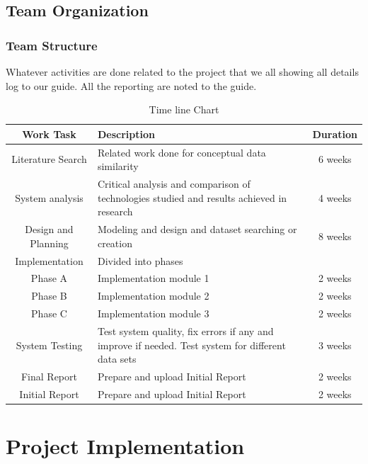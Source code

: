 \documentclass[oneside,a4paper,12pt]{report}
\begin{document}
{\begin{center}
\begin{figure}[!htbp]
	\end{figure}
\end{center} 


\newpage
\section{Team Organization}
\subsection{Team Structure}
Whatever activities are done related to the project that we all showing all details log to our guide. All the reporting are noted to the guide.

\begin{table}[!htbp]
\begin{center}
\def\arraystretch{1.5}
  \begin{tabular}{| c | p{6cm} | c |}
\hline
\textbf{Work Task}	&\textbf{Description}	&\textbf{Duration} \\ \hline
Literature Search	&Related  work  done  for  conceptual  data similarity	&6 weeks \\ \hline
System analysis	&Critical analysis and comparison of technologies  studied  and  results  achieved  in research	&4 weeks \\ \hline
Design and Planning	&Modeling and design and dataset searching or creation	&8 weeks \\ \hline
Implementation	&Divided into phases	& \\ \hline
Phase A	&Implementation module 1	&2 weeks \\ \hline
Phase B	&Implementation module 2	&2 weeks \\ \hline
Phase C	&Implementation module 3	&2 weeks \\ \hline
System Testing	&Test system quality, fix errors if any and improve if needed. Test system for different data sets	&3 weeks \\ \hline
Final Report	&Prepare and upload Initial Report	&2 weeks \\ \hline
Initial Report	&Prepare and upload Initial Report	&2 weeks \\ \hline
\end{tabular}
 \caption {Time line Chart}
 \label{tab:Timeline Chart}
\end{center}
\end{table}
\newpage
\chapter{Project Implementation}
}
\end{document}

